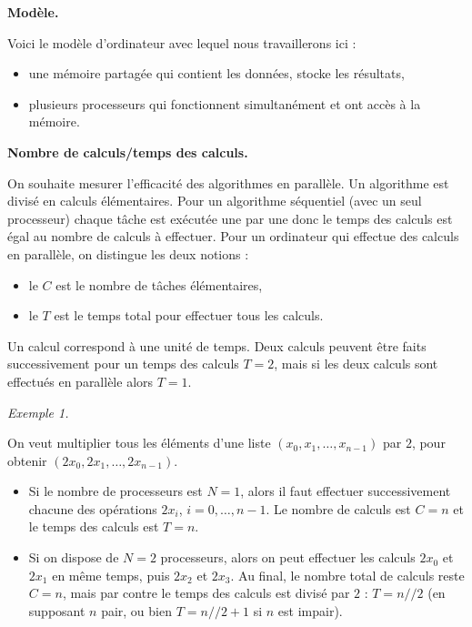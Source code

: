 \documentclass[11pt,class=report,crop=false]{standalone}
\begin{document}
\begin{cours}

\textbf{Modèle.}

Voici le modèle d'ordinateur avec lequel nous travaillerons ici :
\begin{itemize}
  \item une mémoire partagée qui contient les données, stocke les résultats,
  \item plusieurs processeurs qui fonctionnent simultanément et ont accès à la mémoire.
\end{itemize}


\bigskip

\textbf{Nombre de calculs/temps des calculs.}

On souhaite mesurer l'efficacité des algorithmes en parallèle.
Un algorithme est divisé en calculs élémentaires.
Pour un algorithme séquentiel (avec un seul processeur) chaque tâche est exécutée une par une donc le temps des calculs est égal au nombre de calculs à effectuer.
Pour un ordinateur qui effectue des calculs en parallèle, on distingue les deux notions :
\begin{itemize}
    \item le  $C$ est le nombre de tâches élémentaires,
    \item le  $T$ est le temps total pour effectuer tous les calculs.  
  \end{itemize}
  Un calcul correspond à une unité de temps. Deux calculs peuvent être faits successivement pour un temps des calculs $T=2$, mais si les deux calculs sont effectués en parallèle alors $T=1$.

\bigskip

\emph{Exemple 1.}
  
On veut multiplier tous les éléments d'une liste $(x_0,x_1,\ldots,x_{n-1})$ par $2$, pour obtenir $(2x_0,2x_1,\ldots,2x_{n-1})$.
\begin{itemize}
  \item Si le nombre de processeurs est $N=1$, alors il faut effectuer successivement chacune des opérations $2x_i$, $i=0,\ldots,n-1$. Le nombre de calculs est $C=n$ et le temps des calculs est $T=n$.
   
  \item Si on dispose de $N=2$ processeurs, alors on peut effectuer les calculs 
  $2x_0$ et $2x_1$ en même temps, puis $2x_2$ et $2x_3$. Au final, le nombre total de calculs reste $C=n$, mais par contre le temps des calculs est divisé par $2$ : $T=n//2$ (en supposant $n$ pair, ou bien $T=n//2+1$ si $n$ est impair).
  

\end{itemize}
\end{cours}
\end{document}
